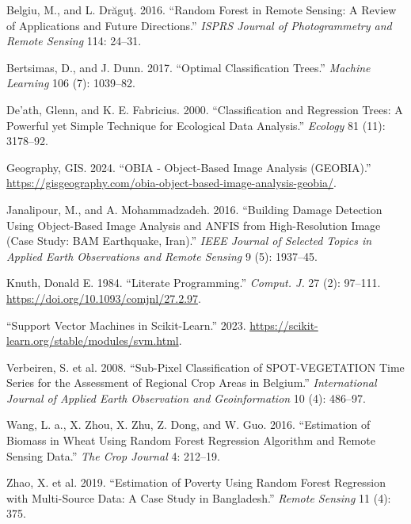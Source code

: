 \documentclass[
  letterpaper,
  DIV=11,
  numbers=noendperiod]{scrreprt}
\newlength{\cslhangindent}
\newenvironment{CSLReferences}[2] %
 {\begin{list}{}{%
  \setlength{\itemindent}{0pt}
  \setlength{\leftmargin}{0pt}
  \setlength{\parsep}{0pt}
  \ifodd #1
   \setlength{\leftmargin}{\cslhangindent}
   \setlength{\itemindent}{-1\cslhangindent}
  \fi
  \setlength{\itemsep}{#2\baselineskip}}}
 {\end{list}}
\begin{document}
\label{refs}
\begin{CSLReferences}{1}{0}
Belgiu, M., and L. Drăguţ. 2016. {``Random Forest in Remote Sensing: A
Review of Applications and Future Directions.''} \emph{ISPRS Journal of
Photogrammetry and Remote Sensing} 114: 24--31.

Bertsimas, D., and J. Dunn. 2017. {``Optimal Classification Trees.''}
\emph{Machine Learning} 106 (7): 1039--82.

De'ath, Glenn, and K. E. Fabricius. 2000. {``Classification and
Regression Trees: A Powerful yet Simple Technique for Ecological Data
Analysis.''} \emph{Ecology} 81 (11): 3178--92.

Geography, GIS. 2024. {``OBIA - Object-Based Image Analysis (GEOBIA).''}
\url{https://gisgeography.com/obia-object-based-image-analysis-geobia/}.

Janalipour, M., and A. Mohammadzadeh. 2016. {``Building Damage Detection
Using Object-Based Image Analysis and ANFIS from High-Resolution Image
(Case Study: BAM Earthquake, Iran).''} \emph{IEEE Journal of Selected
Topics in Applied Earth Observations and Remote Sensing} 9 (5):
1937--45.

Knuth, Donald E. 1984. {``Literate Programming.''} \emph{Comput. J.} 27
(2): 97--111. \url{https://doi.org/10.1093/comjnl/27.2.97}.

{``Support Vector Machines in Scikit-Learn.''} 2023.
\url{https://scikit-learn.org/stable/modules/svm.html}.

Verbeiren, S. et al. 2008. {``Sub-Pixel Classification of
SPOT-VEGETATION Time Series for the Assessment of Regional Crop Areas in
Belgium.''} \emph{International Journal of Applied Earth Observation and
Geoinformation} 10 (4): 486--97.

Wang, L. a., X. Zhou, X. Zhu, Z. Dong, and W. Guo. 2016. {``Estimation
of Biomass in Wheat Using Random Forest Regression Algorithm and Remote
Sensing Data.''} \emph{The Crop Journal} 4: 212--19.

Zhao, X. et al. 2019. {``Estimation of Poverty Using Random Forest
Regression with Multi-Source Data: A Case Study in Bangladesh.''}
\emph{Remote Sensing} 11 (4): 375.

\end{CSLReferences}
\end{document}
